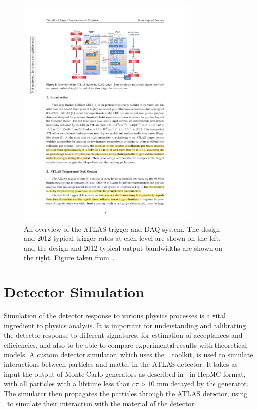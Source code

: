 \begin{figure}[h]
\centering
\includegraphics[width=0.8\textwidth]{trigger_overview}
\caption[An overview of the ATLAS trigger and DAQ system.]{An overview of the ATLAS trigger and DAQ system. The design and 2012
typical trigger rates at each level are shown on the left, and the design and
2012 typical output bandwidths are shown on the right. Figure taken
from~\cite{Petersen:1491585}.}
\label{fig:trigger_overview}
\end{figure}

\section{Detector Simulation}

Simulation of the detector response to various physics processes is a vital
ingredient to physics analysis. It is important for understanding and
calibrating the detector response to different signatures, for estimation of
acceptances and efficiencies, and also to be able to compare experimental
results with theoretical models. A custom detector simulator, which uses the
\geant~\cite{Agostinelli2003250} toolkit, is used to simulate interactions
between particles and matter in the ATLAS detector. It takes as input the output
of Monte-Carlo generators as described in~ in HepMC format, with all
particles with a lifetime less than $c \tau > 10$ mm decayed by the generator.
The simulator then propagates the particles through the ATLAS detector, using
\geant\ to simulate their interaction with the material of the detector. 

